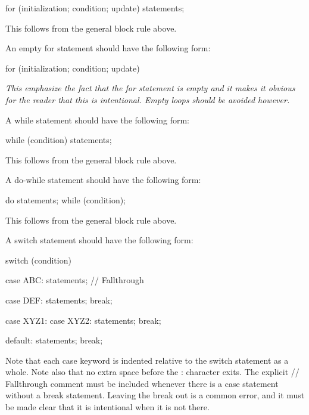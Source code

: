 \documentclass[a4paper,11pt,oneside]{scrbook}
\newcommand{\motivation}[1]{{\normalfont \itshape #1}}
\newcommand{\trcode}[1]{{\normalfont \ttfamily #1}}
\begin{document}
\begin{code}
  for (initialization; condition; update) {
    statements;
  }
\end{code}

This follows from the general block rule above.

An empty for  statement should have the following form: 

\begin{code}
  for (initialization; condition; update) {
  }
\end{code}

\motivation{
  This emphasize the fact that the for statement is empty and it makes
  it obvious for the reader that this is intentional. Empty loops should
  be avoided however.
}

A while  statement should have the following form: 

\begin{code}
  while (condition) {
    statements;
  }
\end{code}

This follows from the general block rule above.  

A do-while  statement should have the following form: 

\begin{code}
  do {
    statements;
  } while (condition);
\end{code}

This follows from the general block rule above.

A switch  statement should have the following form: 

\begin{code}
  switch (condition) {
    case ABC: 
      statements;
      // Fallthrough

    case DEF: 
      statements;
      break;

    case XYZ1: 
    case XYZ2: 
      statements;
      break;

    default: 
      statements;
      break;
  }
\end{code}

Note that each \trcode{case} keyword is indented relative to the switch
statement as a whole. Note also that no extra space before the : character
exits. The explicit \trcode{// Fallthrough} comment must be included whenever
there is a case statement without a \trcode{break} statement. Leaving the
\trcode{break} out is a common error, and it must be made clear that it is
intentional when it is not there.
\end{document}

